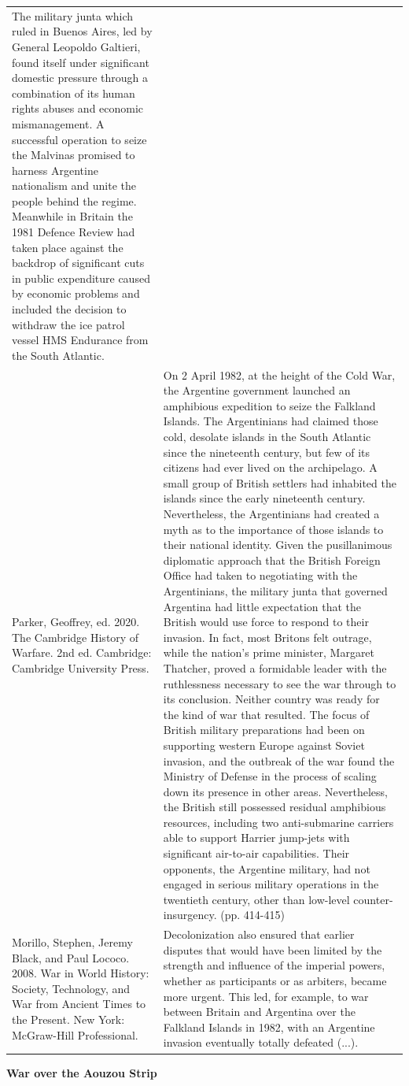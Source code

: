 {\begin{longtable}{p{}p{}}
The military junta which ruled in Buenos Aires, led by General Leopoldo Galtieri, found itself under significant domestic pressure through a combination of its human rights abuses and economic mismanagement. A successful operation to seize the Malvinas promised to harness Argentine nationalism and unite the people behind the regime. Meanwhile in Britain the 1981 Defence Review had taken place against the backdrop of significant cuts in public expenditure caused by economic problems and included the decision to withdraw the ice patrol vessel HMS Endurance from the South Atlantic.
\\
Parker, Geoffrey, ed. 2020. The Cambridge History of Warfare. 2nd ed. Cambridge: Cambridge University Press. & On 2 April 1982, at the height of the Cold War, the Argentine government launched an amphibious expedition to seize the Falkland Islands. The Argentinians had claimed those cold, desolate islands in the South Atlantic since the nineteenth century, but few of its citizens had ever lived on the archipelago. A small group of British settlers had inhabited the islands since the early nineteenth century. Nevertheless, the Argentinians had created a myth as to the importance of those islands to their national identity. Given the pusillanimous diplomatic approach that the British Foreign Office had taken to negotiating with the Argentinians, the military junta that governed Argentina had little expectation that the British would use force to respond to their invasion. In fact, most Britons felt outrage, while the nation's prime minister, Margaret Thatcher, proved a formidable leader with the ruthlessness necessary to see the war through to its conclusion. Neither country was ready for the kind of war that resulted. The focus of British military preparations had been on supporting western Europe against Soviet invasion, and the outbreak of the war found the Ministry of Defense in the process of scaling down its presence in other areas. Nevertheless, the British still possessed residual amphibious resources, including two anti-submarine carriers able to support Harrier jump-jets with significant air-to-air capabilities. Their opponents, the Argentine military, had not engaged in serious military operations in the twentieth century, other than low-level counter-insurgency. (pp. 414-415)
\\
Morillo, Stephen, Jeremy Black, and Paul Lococo. 2008. War in World History: Society, Technology, and War from Ancient Times to the Present. New York: McGraw-Hill Professional. & Decolonization also ensured that earlier disputes that would have been limited by the strength and influence of the imperial powers, whether as participants or as arbiters, became more urgent. This led, for example, to war between Britain and Argentina over the Falkland Islands in 1982, with an Argentine invasion eventually totally defeated (...).
\\
\end{longtable}}
\clearpage
         \textbf{War over the Aouzou Strip} 

